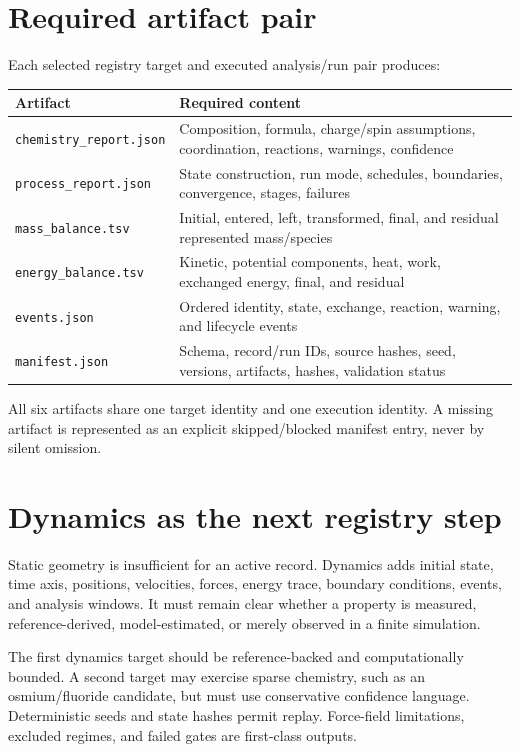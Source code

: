 \documentclass[10pt]{article}
\begin{document}
\section*{Required artifact pair}
Each selected registry target and executed analysis/run pair produces:
\begin{center}
\begin{tabularx}{\textwidth}{@{}lX@{}}
\toprule
Artifact & Required content \\
\midrule
\texttt{chemistry\_report.json} & Composition, formula, charge/spin assumptions, coordination, reactions, warnings, confidence \\
\texttt{process\_report.json} & State construction, run mode, schedules, boundaries, convergence, stages, failures \\
\texttt{mass\_balance.tsv} & Initial, entered, left, transformed, final, and residual represented mass/species \\
\texttt{energy\_balance.tsv} & Kinetic, potential components, heat, work, exchanged energy, final, and residual \\
\texttt{events.json} & Ordered identity, state, exchange, reaction, warning, and lifecycle events \\
\texttt{manifest.json} & Schema, record/run IDs, source hashes, seed, versions, artifacts, hashes, validation status \\
\bottomrule
\end{tabularx}
\end{center}

All six artifacts share one target identity and one execution identity. A missing artifact is represented as an explicit skipped/blocked manifest entry, never by silent omission.

\newpage
\section*{Dynamics as the next registry step}
Static geometry is insufficient for an active record. Dynamics adds initial state, time axis, positions, velocities, forces, energy trace, boundary conditions, events, and analysis windows. It must remain clear whether a property is measured, reference-derived, model-estimated, or merely observed in a finite simulation.

The first dynamics target should be reference-backed and computationally bounded. A second target may exercise sparse chemistry, such as an osmium/fluoride candidate, but must use conservative confidence language. Deterministic seeds and state hashes permit replay. Force-field limitations, excluded regimes, and failed gates are first-class outputs.
\end{document}
